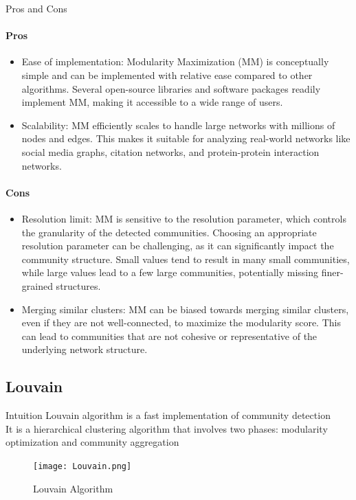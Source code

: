 \begin{frame}[fragile]{Pros and Cons}
    \paragraph{Pros}
    \begin{itemize}
        \item Ease of implementation: Modularity Maximization (MM) is conceptually simple and can be implemented with relative ease compared to other algorithms. Several open-source libraries and software packages readily implement MM, making it accessible to a wide range of users.
        \item Scalability: MM efficiently scales to handle large networks with millions of nodes and edges. This makes it suitable for analyzing real-world networks like social media graphs, citation networks, and protein-protein interaction networks.
    \end{itemize}
    \paragraph{Cons}
    \begin{itemize}
        \item Resolution limit: MM is sensitive to the resolution parameter, which controls the granularity of the detected communities. Choosing an appropriate resolution parameter can be challenging, as it can significantly impact the community structure. Small values tend to result in many small communities, while large values lead to a few large communities, potentially missing finer-grained structures.
        \item Merging similar clusters: MM can be biased towards merging similar clusters, even if they are not well-connected, to maximize the modularity score. This can lead to communities that are not cohesive or representative of the underlying network structure.
    \end{itemize}
\end{frame}
\subsection{Louvain}
\begin{frame}[fragile]{Intuition}
Louvain algorithm is a fast implementation of community detection\\
It is a hierarchical clustering algorithm that involves two phases: modularity optimization and community aggregation
\begin{center}
    \begin{figure}[!htp]
    \centering
    \texttt{[image: Louvain.png]}
    \caption{Louvain Algorithm}
    \label{subsection}
\end{figure}
\end{center}
\end{frame}